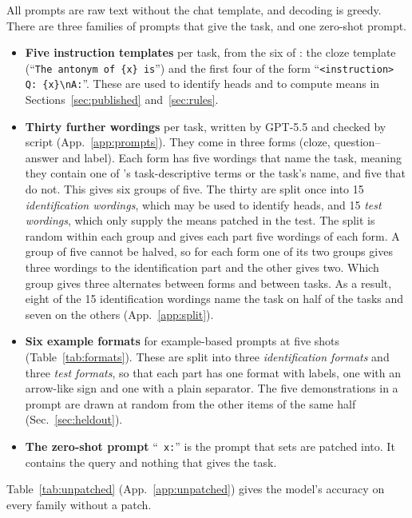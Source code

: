 \documentclass[10pt,a4paper]{article}
\newcommand{\nl}{\textbackslash n}
\newcommand{\p}[1]{``\texttt{#1}''}
\begin{document}
All prompts are raw text without the chat template, and decoding is greedy. There are three families of prompts that give the task, and one zero-shot prompt.
\begin{itemize}
\item \textbf{Five instruction templates} per task, from the six of \citet[App.~A.3.1]{yang2026shared}: the cloze template (\p{The antonym of \{x\} is}) and the first four of the form \p{<instruction> Q: \{x\}\nl A:}. These are used to identify heads and to compute means in Sections~\ref{sec:published} and~\ref{sec:rules}.
\item \textbf{Thirty further wordings} per task, written by GPT-5.5 and checked by script (App.~\ref{app:prompts}). They come in three forms (cloze, question--answer and label). Each form has five wordings that name the task, meaning they contain one of \citeauthor{yang2026shared}'s task-descriptive terms or the task's name, and five that do not. This gives six groups of five. The thirty are split once into 15 \emph{identification wordings}, which may be used to identify heads, and 15 \emph{test wordings}, which only supply the means patched in the test. The split is random within each group and gives each part five wordings of each form. A group of five cannot be halved, so for each form one of its two groups gives three wordings to the identification part and the other gives two. Which group gives three alternates between forms and between tasks. As a result, eight of the 15 identification wordings name the task on half of the tasks and seven on the others (App.~\ref{app:split}).
\item \textbf{Six example formats} for example-based prompts at five shots (Table~\ref{tab:formats}). These are split into three \emph{identification formats} and three \emph{test formats}, so that each part has one format with labels, one with an arrow-like sign and one with a plain separator. The five demonstrations in a prompt are drawn at random from the other items of the same half (Sec.~\ref{sec:heldout}).
\item \textbf{The zero-shot prompt} \p{ x:} is the prompt that sets are patched into. It contains the query and nothing that gives the task.
\end{itemize}
Table~\ref{tab:unpatched} (App.~\ref{app:unpatched}) gives the model's accuracy on every family without a patch.
\end{document}
